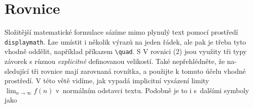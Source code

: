 \documentclass[a4paper, 11pt, twocolumn]{article}
\begin{document}
    \section{Rovnice} 
    Složitější matematické formulace sázíme mimo plynulý text pomocí prostředí \verb|displaymath|. Lze umístit i ně\-kolik výrazů na jeden řádek, ale pak je třeba tyto vhodně oddělit, například příkazem \verb|\quad|. 
    S
    \newline V rovnici (2) jsou využity tři typy závorek s různou \emph{ex\-plicitně} definovanou velikostí. Také nepřehlédněte, že na- sledující tři rovnice mají zarovnaná rovnítka, a použijte k tomuto účelu vhodné prostředí.
    \newline V této větě vidíme, jak vypadá implicitní vysázení limity $\lim_{n \to \infty}f(n)$ v~normálním odstavci textu. Podobně je to i s~dalšími symboly jako
\end{document}
